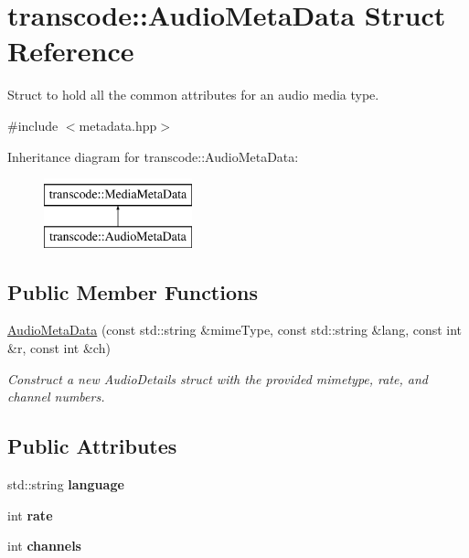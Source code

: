 \hypertarget{structtranscode_1_1AudioMetaData}{
\section{transcode::AudioMetaData Struct Reference}
\label{structtranscode_1_1AudioMetaData}
}


Struct to hold all the common attributes for an audio media type.  




{\ttfamily \#include $<$metadata.hpp$>$}

Inheritance diagram for transcode::AudioMetaData:\begin{figure}[H]
\begin{center}
\leavevmode
\includegraphics[height=2.000000cm]{structtranscode_1_1AudioMetaData}
\end{center}
\end{figure}
\subsection*{Public Member Functions}
\begin{DoxyCompactItemize}
\item 
\hyperlink{structtranscode_1_1AudioMetaData_ab01057c9c6911c59da09da7de8b43c69}{AudioMetaData} (const std::string \&mimeType, const std::string \&lang, const int \&r, const int \&ch)
\begin{DoxyCompactList}\small\item\em Construct a new AudioDetails struct with the provided mimetype, rate, and channel numbers. \item\end{DoxyCompactList}\end{DoxyCompactItemize}
\subsection*{Public Attributes}
\begin{DoxyCompactItemize}
\item 
\hypertarget{structtranscode_1_1AudioMetaData_a648138cfa52e79c16c1ade849be055c6}{
std::string {\bfseries language}}
\label{structtranscode_1_1AudioMetaData_a648138cfa52e79c16c1ade849be055c6}

\item 
\hypertarget{structtranscode_1_1AudioMetaData_ac4e4d96acd8ee5abf97e63cdc0db46df}{
int {\bfseries rate}}
\label{structtranscode_1_1AudioMetaData_ac4e4d96acd8ee5abf97e63cdc0db46df}

\item 
\hypertarget{structtranscode_1_1AudioMetaData_a1bb969fdca1da86d2cb3f1ec0d490be9}{
int {\bfseries channels}}
\label{structtranscode_1_1AudioMetaData_a1bb969fdca1da86d2cb3f1ec0d490be9}

\end{DoxyCompactItemize}


